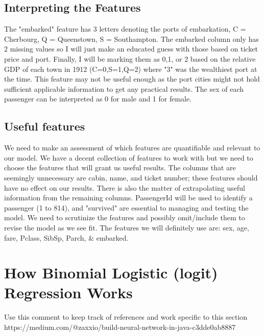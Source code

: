 \documentclass[notitlepage,a4paper,oneside,article,table]{article}
\begin{document}
    \subsection{Interpreting the Features}
The "embarked" feature has 3 letters denoting the ports of embarkation, C = Cherbourg, Q = Queenstown, S = Southampton. The embarked column only has 2 missing values so I will just make an educated guess with those based on ticket price and port. Finally, I will be marking them as 0,1, or 2 based on the relative GDP of each town in 1912 (C=0,S=1,Q=2) where "3" was the wealthiest port at the time. This feature may not be useful enough as the port cities might not hold sufficient applicable information to get any practical results. The sex of each passenger can be interpreted as 0 for male and 1 for female. 

    \subsection{Useful features}

We need to make an assessment of which features are quantifiable and relevant to our model. We have a decent collection of features to work with but we need to choose the features that will grant us useful results. The columns that are seemingly unnecessary are cabin, name, and ticket number; these features should have no effect on our results. There is also the matter of extrapolating useful information from the remaining columns. PassengerId will be used to identify a passenger (1 to 814), and "survived" are essential to managing and testing the model. We need to scrutinize the features and possibly omit/include them to revise the model as we see fit. The features we will definitely use are: sex, age, fare, Pclass, SibSp, Parch, \& embarked.
    
\section{How Binomial Logistic (logit) Regression Works}
\iffalse 
Use this comment to keep track of references and work specific to this section
https://medium.com/@zaxxio/build-neural-network-in-java-c3dde0ab8887
\end{document}
